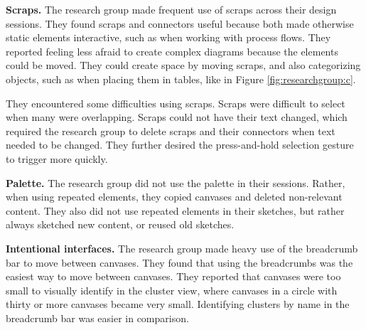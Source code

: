 \documentclass[12pt,fleqn]{ucithesis}
\begin{document}
\textbf{Scraps.} The research group made frequent use of scraps across their design sessions. They found scraps and connectors useful because both made otherwise static elements interactive, such as when working with process flows. They reported feeling less afraid to create complex diagrams because the elements could be moved.  They could create space by moving scraps, and also categorizing objects, such as when placing them in tables, like in Figure \ref{fig:researchgroup:c}. 

They encountered some difficulties using scraps. Scraps were difficult to select when many were overlapping. Scraps could not have their text changed, which required the research group to delete scraps and their connectors when text needed to be changed. They further desired the press-and-hold selection gesture to trigger more quickly.
%
%
%
%
%
%
%

\textbf{Palette.} The research group did not use the palette in their sessions. Rather, when using repeated elements, they copied canvases and deleted non-relevant content. They also did not use repeated elements in their sketches, but rather always sketched new content, or reused old sketches.

\textbf{Intentional interfaces.} The research group made heavy use of the breadcrumb bar to move between canvases. They found that using the breadcrumbs was the easiest way to move between canvases. They reported that canvases were too small to visually identify in the cluster view, where canvases in a circle with thirty or more canvases became very small. Identifying clusters by name in the breadcrumb bar was easier in comparison.
\end{document}
